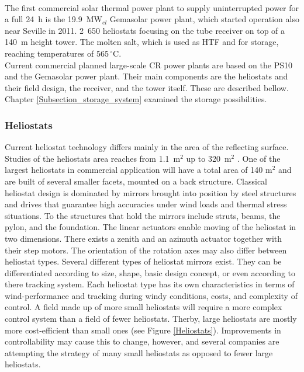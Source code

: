 \documentclass[Master,MEE,english]{twbook}%
\begin{document}
\\
The first commercial solar thermal power plant to supply uninterrupted power for a full 24~h is the 19.9~MW$_{el}$ Gemasolar power plant, which started operation also near Seville in 2011. 2~650 heliostats focusing on the tube receiver on top of a 140~m height tower. The molten salt, which is used as HTF and for storage, reaching temperatures of 565$\,^{\circ}\mathrm{C}$.\\
Current commercial planned large-scale CR power plants are based on the PS10 and the Gemasolar power plant. Their main components are the heliostats and their field design, the receiver, and the tower itself. These are described bellow. Chapter \ref{Subsection_storage_system} examined the storage possibilities.  \pagebreak
\subsubsection{Heliostats}
Current heliostat technology differs mainly in the area of the reflecting surface. Studies of the heliostats area reaches from 1.1~m$^2$ up to 320~m$^2$ \cite{Tyner2014,Blackmon2012}. One of the largest heliostats in commercial application will have a total area of 140 m$^2$ \cite{Abengoa2014} and are built of several smaller facets, mounted on a back structure. Classical heliostat design is dominated by mirrors brought into position by steel structures and drives that guarantee high accuracies under wind loads and thermal stress situations. To the structures that hold the mirrors include struts, beams, the pylon, and the foundation. The linear actuators enable moving of the heliostat in two dimensions. There exists a zenith and an azimuth actuator together with their step motors. The orientation of the rotation axes may also differ between heliostat types. Several different types of heliostat mirrors exist. They can be differentiated according to size, shape, basic design concept, or even according to there tracking system. Each heliostat type has its own characteristics in terms of wind-performance and tracking during windy conditions, costs, and complexity of control. A field made up of more small heliostats will require a more complex control system than a field of fewer heliostats. Therby, large heliostats are mostly more cost-efficient than small ones (see Figure \ref{Heliostats}). Improvements in controllability may cause this to change, however, and several companies are attempting the strategy of many small heliostats as opposed to fewer large heliostats.
\end{document}
